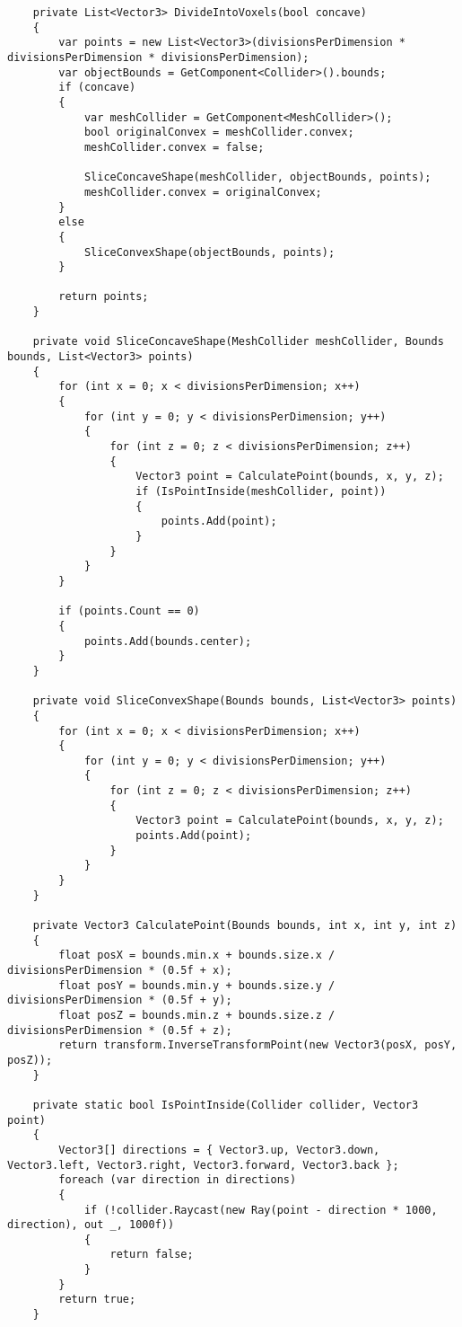 \begin{lstlisting}
    private List<Vector3> DivideIntoVoxels(bool concave)
    {
        var points = new List<Vector3>(divisionsPerDimension * divisionsPerDimension * divisionsPerDimension);
        var objectBounds = GetComponent<Collider>().bounds;
        if (concave)
        {
            var meshCollider = GetComponent<MeshCollider>();
            bool originalConvex = meshCollider.convex;
            meshCollider.convex = false;

            SliceConcaveShape(meshCollider, objectBounds, points);
            meshCollider.convex = originalConvex;
        }
        else
        {
            SliceConvexShape(objectBounds, points);
        }

        return points;
    }

    private void SliceConcaveShape(MeshCollider meshCollider, Bounds bounds, List<Vector3> points)
    {
        for (int x = 0; x < divisionsPerDimension; x++)
        {
            for (int y = 0; y < divisionsPerDimension; y++)
            {
                for (int z = 0; z < divisionsPerDimension; z++)
                {
                    Vector3 point = CalculatePoint(bounds, x, y, z);
                    if (IsPointInside(meshCollider, point))
                    {
                        points.Add(point);
                    }
                }
            }
        }

        if (points.Count == 0)
        {
            points.Add(bounds.center);
        }
    }

    private void SliceConvexShape(Bounds bounds, List<Vector3> points)
    {
        for (int x = 0; x < divisionsPerDimension; x++)
        {
            for (int y = 0; y < divisionsPerDimension; y++)
            {
                for (int z = 0; z < divisionsPerDimension; z++)
                {
                    Vector3 point = CalculatePoint(bounds, x, y, z);
                    points.Add(point);
                }
            }
        }
    }

    private Vector3 CalculatePoint(Bounds bounds, int x, int y, int z)
    {
        float posX = bounds.min.x + bounds.size.x / divisionsPerDimension * (0.5f + x);
        float posY = bounds.min.y + bounds.size.y / divisionsPerDimension * (0.5f + y);
        float posZ = bounds.min.z + bounds.size.z / divisionsPerDimension * (0.5f + z);
        return transform.InverseTransformPoint(new Vector3(posX, posY, posZ));
    }

    private static bool IsPointInside(Collider collider, Vector3 point)
    {
        Vector3[] directions = { Vector3.up, Vector3.down, Vector3.left, Vector3.right, Vector3.forward, Vector3.back };
        foreach (var direction in directions)
        {
            if (!collider.Raycast(new Ray(point - direction * 1000, direction), out _, 1000f))
            {
                return false;
            }
        }
        return true;
    }


\end{lstlisting}
